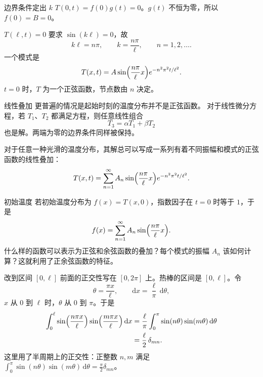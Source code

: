 \documentclass[fontset=windows, chinese, 10pt, xcolor=dvipsnames]{beamer}
\begin{document}
\begin{frame}{边界条件定出 $k$}
  $T(0,t)=f(0)g(t)=0$。$g(t)$ 不恒为零，所以 $f(0)=B=0$。
  \vspace{0.3em}

  $T(\ell,t)=0$ 要求 $\sin(k\ell)=0$，故
  \begin{equation*}
    k\ell=n\pi,
    \qquad
    k=\frac{n\pi}{\ell},
    \qquad n=1,2,\ldots.
  \end{equation*}
  一个模式是
  \begin{equation*}
    T(x,t)
    =A\sin\Bigl(\frac{n\pi}{\ell}x\Bigr)
     e^{-n^2\pi^2 t/\ell^2}.
  \end{equation*}
  $t=0$ 时，$T$ 为一个正弦函数，节点数由 $n$ 决定。
\end{frame}

\begin{frame}{线性叠加}
  更普遍的情况是起始时刻的温度分布并不是正弦函数。
  对于线性微分方程，若 $T_1$、$T_2$ 都满足方程，则任意线性组合
  \begin{equation*}
    T_3=\alpha T_1+\beta T_2
  \end{equation*}
  也是解。两端为零的边界条件同样被保持。
  \vspace{0.4em}

  对于任意一种光滑的温度分布，其解总可以写成一系列有着不同振幅和模式的正弦函数的线性叠加：
  \begin{equation*}
    T(x,t)=\sum_{n=1}^{\infty}
      A_n\sin\Bigl(\frac{n\pi}{\ell}x\Bigr)
      e^{-n^2\pi^2 t/\ell^2}.
  \end{equation*}
\end{frame}

\begin{frame}{初始温度}
  若初始温度分布为 $f(x)=T(x,0)$，指数因子在 $t=0$ 时等于 $1$，于是
  \begin{equation*}
    f(x)=\sum_{n=1}^{\infty}
      A_n\sin\Bigl(\frac{n\pi}{\ell}x\Bigr).
  \end{equation*}
  什么样的函数可以表示为正弦和余弦函数的叠加？每个模式的振幅 $A_n$ 该如何计算？这就利用了正余弦函数的特征。
\end{frame}

\begin{frame}{改到区间 $[0,\ell]$}
  前面的正交性写在 $[0,2\pi]$ 上。热棒的区间是 $[0,\ell]$。令
  \begin{equation*}
    \theta=\frac{\pi x}{\ell},
    \qquad
    \mathrm{d}x=\frac{\ell}{\pi}\,\mathrm{d}\theta,
  \end{equation*}
  $x$ 从 $0$ 到 $\ell$ 时，$\theta$ 从 $0$ 到 $\pi$。于是
  \begin{align*}
    \int_0^{\ell}
      \sin\Bigl(\frac{n\pi x}{\ell}\Bigr)
      \sin\Bigl(\frac{m\pi x}{\ell}\Bigr)
      \,\mathrm{d}x
    &=\frac{\ell}{\pi}\int_0^{\pi}\sin(n\theta)\sin(m\theta)\,\mathrm{d}\theta \\
    &=\frac{\ell}{2}\,\delta_{mn}.
  \end{align*}
  这里用了半周期上的正交性：正整数 $n,m$ 满足
  $\displaystyle\int_0^{\pi}\sin(n\theta)\sin(m\theta)\,\mathrm{d}\theta=\tfrac{\pi}{2}\delta_{mn}$。
\end{frame}
\end{document}
